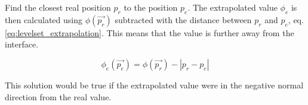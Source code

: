 Find the closest real position $p_r$ to the position $p_e$. The extrapolated value $\phi_e$ is then calculated using $\phi(\vec{p_r})$ subtracted with the distance between $p_r$ and $p_e$, eq. \ref{eq:levelset_extrapolation}. This means that the value is further away from the interface. 

\begin{equation}
\label{eq:levelset_extrapolation}
\phi_e(\vec{p_e}) =  \phi(\vec{p_r}) - \left | p_r - p_e  \right |
\end{equation} 

This solution would be true if the extrapolated value were in the negative normal direction from the real value.